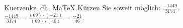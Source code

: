 \begin{MAufgabe}{Kuerzen}{kr, dh, MaTeX}
K\"urzen Sie soweit m\"oglich: $\frac{-1449}{3174}$.\\ 
\ifLsg\MLoesung
\quad $\frac{-1449}{3174}=\frac{(69)\cdot(-21)}{(69)\cdot(46)}=\frac{-21}{46}$.\else\relax\fi
 \end{MAufgabe}